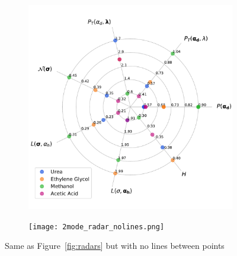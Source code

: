 \documentclass{article}
\begin{document}
  \begin{figure}
  \centering
  \begin{subfigure}{0.45\textwidth}
  \includegraphics[width=\linewidth]{1mode_radar_nolines.pdf}
  \caption{}\label{fig:1mode_radar}
  \end{subfigure}
  \begin{subfigure}{0.45\textwidth}
  \texttt{[image: 2mode\_radar\_nolines.png]}   %
  \caption{}\label{fig:2mode_radar}
  \end{subfigure}
  \caption{Same as Figure~\ref{fig:radars} but with no lines between points}\label{fig:radars_nolines}
  \end{figure}
  
  
\end{document}
